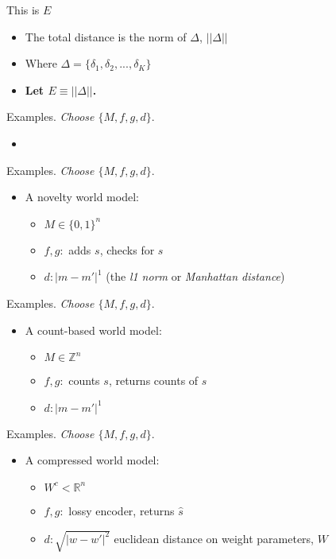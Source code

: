 \documentclass[10pt]{beamer}
\begin{document}
\begin{frame}[fragile]{This is $E$}
\begin{itemize}
\item The total distance is the norm of $\Delta$, $||\Delta||$
\item Where $\Delta = \{\delta_1, \delta_2,...,\delta_K\}$
\item \textbf{Let $E \equiv ||\Delta||$.}
\end{itemize}
\end{frame}

\begin{frame}[fragile]{Examples.}
\textit{Choose $\{M, f, g, d\}$}.
\begin{itemize}
    \item 
\end{itemize}
\end{frame}

\begin{frame}[fragile]{Examples.}
\textit{Choose $\{M, f, g, d\}$}.
\begin{itemize}
    \item A novelty world model:
    \begin{itemize}
        \item $M \in \{0,1\}^n$
        \item $f,g: $ adds $s$, checks for $s$
        \item $d: |m - m'|^1$ (the \textit{l1 norm} or \textit{Manhattan distance})
    \end{itemize}
\end{itemize}
\end{frame}

\begin{frame}[fragile]{Examples.}
\textit{Choose $\{M, f, g, d\}$}.
\begin{itemize}
    \item A count-based world model:
    \begin{itemize}
        \item $M \in \mathbb{Z}^n$
        \item $f,g: $ counts $s$, returns counts of $s$
        \item $d: |m - m'|^1$ 
    \end{itemize}
\end{itemize}
\end{frame}

\begin{frame}[fragile]{Examples.}
\textit{Choose $\{M, f, g, d\}$}.
\begin{itemize}
    \item A compressed world model:
    \begin{itemize}
        \item $W^c < \mathbb{R}^n$
        \item $f,g: $ lossy encoder, returns $\hat s$
        \item $d: \sqrt{|w - w'|^2}$ euclidean distance on weight parameters, $W$
    \end{itemize}
\end{itemize}
\end{frame}
\end{document}
